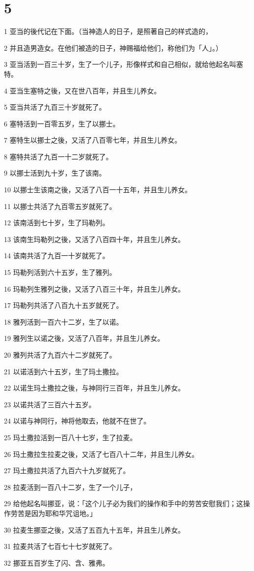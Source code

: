 \chapter{5}

\par 1 亚当的後代记在下面。（当神造人的日子，是照著自己的样式造的，
\par 2 并且造男造女。在他们被造的日子，神赐福给他们，称他们为「人」。）
\par 3 亚当活到一百三十岁，生了一个儿子，形像样式和自己相似，就给他起名叫塞特。
\par 4 亚当生塞特之後，又在世八百年，并且生儿养女。
\par 5 亚当共活了九百三十岁就死了。
\par 6 塞特活到一百零五岁，生了以挪士。
\par 7 塞特生以挪士之後，又活了八百零七年，并且生儿养女。
\par 8 塞特共活了九百一十二岁就死了。
\par 9 以挪士活到九十岁，生了该南。
\par 10 以挪士生该南之後，又活了八百一十五年，并且生儿养女。
\par 11 以挪士共活了九百零五岁就死了。
\par 12 该南活到七十岁，生了玛勒列。
\par 13 该南生玛勒列之後，又活了八百四十年，并且生儿养女。
\par 14 该南共活了九百一十岁就死了。
\par 15 玛勒列活到六十五岁，生了雅列。
\par 16 玛勒列生雅列之後，又活了八百三十年，并且生儿养女。
\par 17 玛勒列共活了八百九十五岁就死了。
\par 18 雅列活到一百六十二岁，生了以诺。
\par 19 雅列生以诺之後，又活了八百年，并且生儿养女。
\par 20 雅列共活了九百六十二岁就死了。
\par 21 以诺活到六十五岁，生了玛土撒拉。
\par 22 以诺生玛土撒拉之後，与神同行三百年，并且生儿养女。
\par 23 以诺共活了三百六十五岁。
\par 24 以诺与神同行，神将他取去，他就不在世了。
\par 25 玛土撒拉活到一百八十七岁，生了拉麦。
\par 26 玛土撒拉生拉麦之後，又活了七百八十二年，并且生儿养女。
\par 27 玛土撒拉共活了九百六十九岁就死了。
\par 28 拉麦活到一百八十二岁，生了一个儿子，
\par 29 给他起名叫挪亚，说：「这个儿子必为我们的操作和手中的劳苦安慰我们；这操作劳苦是因为耶和华咒诅地。」
\par 30 拉麦生挪亚之後，又活了五百九十五年，并且生儿养女。
\par 31 拉麦共活了七百七十七岁就死了。
\par 32 挪亚五百岁生了闪、含、雅弗。

